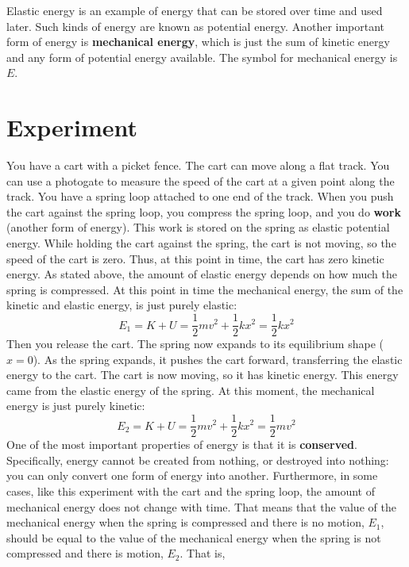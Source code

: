 Elastic energy is an example of energy that can be stored over time and used later. Such kinds of energy are known as potential energy. Another important form of energy is \textbf{mechanical energy}, which is just the sum of kinetic energy and any form of potential energy available. The symbol for mechanical energy is $E$.
\section{Experiment}
You have a cart with a picket fence. The cart can move along a flat track. You can use a photogate to measure the speed of the cart at a given point along the track. You have a spring loop attached to one end of the track. When you push the cart against the spring loop, you compress the spring loop, and you do \textbf{work} (another form of energy). This work is stored on the spring as elastic potential energy. While holding the cart against the spring, the cart is not moving, so the speed of the cart is zero. Thus, at this point in time, the cart has zero kinetic energy. As stated above, the amount of elastic energy depends on how much the spring is compressed. At this point in time the mechanical energy, the sum of the kinetic and elastic energy, is just purely elastic:
\begin{equation}
    E_{1} = K + U = \frac{1}{2} m v^{2} + \frac{1}{2} k x^{2} = \frac{1}{2} k x^{2}
\end{equation}
Then you release the cart. The spring now expands to its equilibrium shape ($x = 0$). As the spring expands, it pushes the cart forward, transferring the elastic energy to the cart. The cart is now moving, so it has kinetic energy. This energy came from the elastic energy of the spring. At this moment, the mechanical energy is just purely kinetic:
\begin{equation}
    E_{2} = K + U = \frac{1}{2} m v^{2} + \frac{1}{2} k x^{2} = \frac{1}{2} m v^{2}
\end{equation}
One of the most important properties of energy is that it is \textbf{conserved}. Specifically, energy cannot be created from nothing, or destroyed into nothing: you can only convert one form of energy into another. Furthermore, in some cases, like this experiment with the cart and the spring loop, the amount of mechanical energy does not change with time. That means that the value of the mechanical energy when the spring is compressed and there is no motion, $E_{1}$, should be equal to the value of the mechanical energy when the spring is not compressed and there is motion, $E_{2}$. That is,
